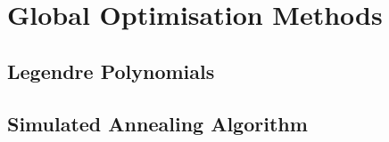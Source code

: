 
\chapter{Global Optimisation Methods}\label{Chapter:GlobalOpt}

\section{Legendre Polynomials}


\section{Simulated Annealing Algorithm}
